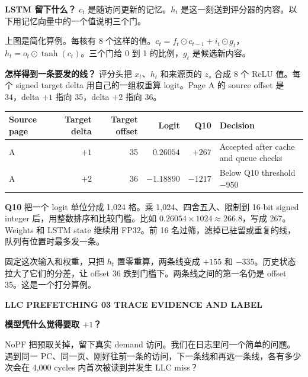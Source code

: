 \documentclass[10pt,letterpaper]{article}
\newcommand{\sectionline}[1]{{\small\bfseries\color{teal} LLC PREFETCHING \hfill #1}\par\vspace{4pt}}
\newcommand{\titleline}[1]{{\LARGE\bfseries #1}\par\vspace{6pt}}
\newcommand{\smallnote}[1]{{\small\color{muted}#1}\par}
\begin{document}
\textbf{LSTM 留下什么？} $c_t$ 是随访问更新的记忆。$h_t$ 是这一刻送到评分器的内容。以下用记忆向量中的一个值说明三个门。

\par
\smallnote{上图是简化算例。每核有 8 个这样的值。$c_t=f_t\odot c_{t-1}+i_t\odot g_t$，$h_t=o_t\odot\tanh(c_t)$。三个门给 0 到 1 的比例，$g_t$ 是候选新内容。}

\textbf{怎样得到一条要发的线？} 评分头把 $x_t$、$h_t$ 和来源页的 $z_s$ 合成 8 个 ReLU 值。每个 signed target delta 用自己的一组权重算 logit。Page A 的 source offset 是 34，delta $+1$ 指向 35，delta $+2$ 指向 36。

{\small
\begin{tabular}{@{}lrrrrl@{}}
\toprule
Source page & Target delta & Target offset & Logit & Q10 & Decision\\
\midrule
A & $+1$ & 35 & $0.26054$ & $+267$ & Accepted after cache and queue checks\\
A & $+2$ & 36 & $-1.18890$ & $-1217$ & Below Q10 threshold $-950$\\
\bottomrule
\end{tabular}\par}
\smallnote{\textbf{Q10} 把一个 logit 单位分成 1,024 格。乘 1,024、四舍五入、限制到 16-bit signed integer 后，用整数排序和比较门槛。比如 $0.26054\times1024\approx266.8$，写成 267。Weights 和 LSTM state 继续用 FP32。前 16 名过筛，滤掉已驻留或重复的线，队列有位置时最多发一条。}
\smallnote{固定这次输入和权重，只把 $h_t$ 置零重算，两条线变成 $+155$ 和 $-335$。历史状态拉大了它们的分差，让 offset 36 跌到门槛下。两条线之间的第一名仍是 offset 35。这是一个打分算例。}

\newpage
\sectionline{03 \hfill TRACE EVIDENCE AND LABEL}
\titleline{模型凭什么觉得要取 $+1$？}
NoPF 把预取关掉，留下真实 demand 访问。我们在日志里问一个简单的问题。遇到同一 PC、同一页、刚好往前一条的访问，下一条线和再远一条线，各有多少次会在 4,000 cycles 内首次被读到并发生 LLC miss？
\end{document}
